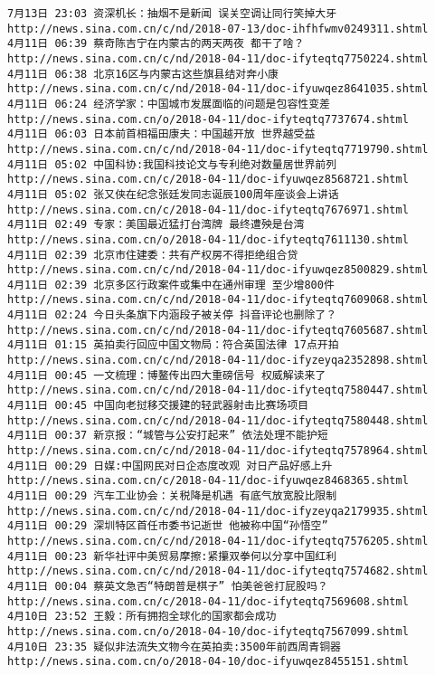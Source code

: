 \documentclass[11pt]{article}
\begin{document}
\begin{Verbatim}[commandchars=\\\{\}]
7月13日 23:03 资深机长：抽烟不是新闻 误关空调让同行笑掉大牙 http://news.sina.com.cn/c/nd/2018-07-13/doc-ihfhfwmv0249311.shtml
4月11日 06:39 蔡奇陈吉宁在内蒙古的两天两夜 都干了啥？ http://news.sina.com.cn/c/nd/2018-04-11/doc-ifyteqtq7750224.shtml
4月11日 06:38 北京16区与内蒙古这些旗县结对奔小康 http://news.sina.com.cn/c/nd/2018-04-11/doc-ifyuwqez8641035.shtml
4月11日 06:24 经济学家：中国城市发展面临的问题是包容性变差 http://news.sina.com.cn/o/2018-04-11/doc-ifyteqtq7737674.shtml
4月11日 06:03 日本前首相福田康夫：中国越开放 世界越受益 http://news.sina.com.cn/c/nd/2018-04-11/doc-ifyteqtq7719790.shtml
4月11日 05:02 中国科协:我国科技论文与专利绝对数量居世界前列 http://news.sina.com.cn/c/2018-04-11/doc-ifyuwqez8568721.shtml
4月11日 05:02 张又侠在纪念张廷发同志诞辰100周年座谈会上讲话 http://news.sina.com.cn/c/2018-04-11/doc-ifyteqtq7676971.shtml
4月11日 02:49 专家：美国最近猛打台湾牌 最终遭殃是台湾 http://news.sina.com.cn/o/2018-04-11/doc-ifyteqtq7611130.shtml
4月11日 02:39 北京市住建委：共有产权房不得拒绝组合贷 http://news.sina.com.cn/c/nd/2018-04-11/doc-ifyuwqez8500829.shtml
4月11日 02:39 北京多区行政案件或集中在通州审理 至少增800件 http://news.sina.com.cn/c/nd/2018-04-11/doc-ifyteqtq7609068.shtml
4月11日 02:24 今日头条旗下内涵段子被关停 抖音评论也删除了？ http://news.sina.com.cn/c/nd/2018-04-11/doc-ifyteqtq7605687.shtml
4月11日 01:15 英拍卖行回应中国文物局：符合英国法律 17点开拍 http://news.sina.com.cn/c/nd/2018-04-11/doc-ifyzeyqa2352898.shtml
4月11日 00:45 一文梳理：博鳌传出四大重磅信号 权威解读来了 http://news.sina.com.cn/c/nd/2018-04-11/doc-ifyteqtq7580447.shtml
4月11日 00:45 中国向老挝移交援建的轻武器射击比赛场项目 http://news.sina.com.cn/c/nd/2018-04-11/doc-ifyteqtq7580448.shtml
4月11日 00:37 新京报：“城管与公安打起来” 依法处理不能护短 http://news.sina.com.cn/c/nd/2018-04-11/doc-ifyteqtq7578964.shtml
4月11日 00:29 日媒:中国网民对日企态度改观 对日产品好感上升 http://news.sina.com.cn/c/2018-04-11/doc-ifyuwqez8468365.shtml
4月11日 00:29 汽车工业协会：关税降是机遇 有底气放宽股比限制 http://news.sina.com.cn/c/nd/2018-04-11/doc-ifyzeyqa2179935.shtml
4月11日 00:29 深圳特区首任市委书记逝世 他被称中国“孙悟空” http://news.sina.com.cn/c/nd/2018-04-11/doc-ifyteqtq7576205.shtml
4月11日 00:23 新华社评中美贸易摩擦:紧攥双拳何以分享中国红利 http://news.sina.com.cn/c/nd/2018-04-11/doc-ifyteqtq7574682.shtml
4月11日 00:04 蔡英文急否“特朗普是棋子” 怕美爸爸打屁股吗？ http://news.sina.com.cn/c/2018-04-11/doc-ifyteqtq7569608.shtml
4月10日 23:52 王毅：所有拥抱全球化的国家都会成功 http://news.sina.com.cn/o/2018-04-10/doc-ifyteqtq7567099.shtml
4月10日 23:35 疑似非法流失文物今在英拍卖:3500年前西周青铜器 http://news.sina.com.cn/o/2018-04-10/doc-ifyuwqez8455151.shtml

\end{Verbatim}
\end{document}
